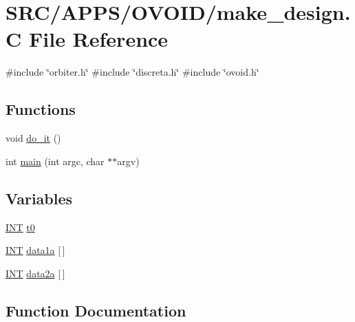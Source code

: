 \hypertarget{make__design_8_c}{}\section{S\+R\+C/\+A\+P\+P\+S/\+O\+V\+O\+I\+D/make\+\_\+design.C File Reference}
\label{make__design_8_c}
{\ttfamily \#include \char`\"{}orbiter.\+h\char`\"{}}\newline
{\ttfamily \#include \char`\"{}discreta.\+h\char`\"{}}\newline
{\ttfamily \#include \char`\"{}ovoid.\+h\char`\"{}}\newline
\subsection*{Functions}
\begin{DoxyCompactItemize}
\item 
void \mbox{\hyperlink{make__design_8_c_a566ddd6b6d958e7e5e51fb862966d579}{do\+\_\+it}} ()
\item 
int \mbox{\hyperlink{make__design_8_c_a3c04138a5bfe5d72780bb7e82a18e627}{main}} (int argc, char $\ast$$\ast$argv)
\end{DoxyCompactItemize}
\subsection*{Variables}
\begin{DoxyCompactItemize}
\item 
\mbox{\hyperlink{galois_8h_a09fddde158a3a20bd2dcadb609de11dc}{I\+NT}} \mbox{\hyperlink{make__design_8_c_a4268f4fe222ffb119218a0199f5e1904}{t0}}
\item 
\mbox{\hyperlink{galois_8h_a09fddde158a3a20bd2dcadb609de11dc}{I\+NT}} \mbox{\hyperlink{make__design_8_c_af1d4f7e0ffa65fbc6361e81c142c2add}{data1a}} \mbox{[}$\,$\mbox{]}
\item 
\mbox{\hyperlink{galois_8h_a09fddde158a3a20bd2dcadb609de11dc}{I\+NT}} \mbox{\hyperlink{make__design_8_c_a9dae36bd8f703eed6fb1eabf9b606ca5}{data2a}} \mbox{[}$\,$\mbox{]}
\end{DoxyCompactItemize}


\subsection{Function Documentation}
\mbox{\label{make__design_8_c_a566ddd6b6d958e7e5e51fb862966d579}} 
